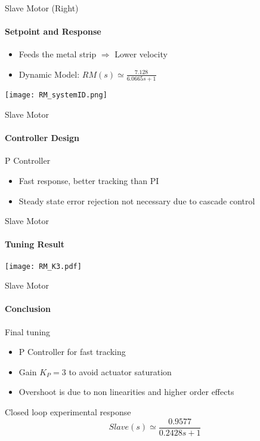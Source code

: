 \begin{frame}{Slave Motor (Right)}
	\framesubtitle{Setpoint and Response}
  \begin{itemize}
		\item Feeds the metal strip $\Rightarrow$ Lower velocity
		\item Dynamic Model: $RM(s) \simeq \frac{7.128}{6.0665s+1}$
	\end{itemize}
			\centering
				\texttt{[image: RM\_systemID.png]}
\end{frame}

\begin{frame}{Slave Motor}
  \framesubtitle{Controller Design}
  \begin{block}{P Controller}
	\begin{itemize}
		\item Fast response, better tracking than PI
		\item Steady state error rejection not necessary due to cascade control
	\end{itemize}
  \end{block}
\end{frame}

\begin{frame}{Slave Motor}
\framesubtitle{Tuning Result}
\centering
\texttt{[image: RM\_K3.pdf]}
\end{frame}

\begin{frame}{Slave Motor}
\framesubtitle{Conclusion}
\begin{block}{Final tuning}
\begin{itemize}
\item P Controller for fast tracking
\item Gain $K_P = 3$ to avoid actuator saturation
\item Overshoot is due to non linearities and higher order effects
\end{itemize}
\end{block}
\begin{block}{Closed loop experimental response}
\[Slave(s) \simeq \frac{0.9577}{0.2428s + 1}\]
\end{block}
\end{frame}
